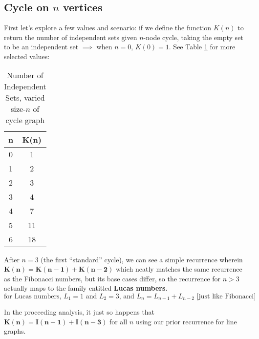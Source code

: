 \documentclass[conference]{styles/acmsiggraph}
\newcommand{\?}{\stackrel{?}{=}}
\DeclareRobustCommand{\mybox}[2][gray!20]{%
\begin{tcolorbox}[   %
        breakable,
        left=0pt,
        right=0pt,
        top=0pt,
        bottom=0pt,
        colback=#1,
        colframe=#1,
        width=\dimexpr\textwidth\relax, 
        enlarge left by=0mm,
        boxsep=5pt,
        arc=0pt,outer arc=0pt,
        ]
        #2
\end{tcolorbox}
}
\begin{document}
\newpage
\subsection{Cycle on $n$ vertices}
First let's explore a few values and scenario: if we define the function $K(n)$ to return the number of independent sets given $n$-node cycle, taking the empty set to be an independent set $\implies$ when $n=0$, $K(0) = 1$.  See Table \ref{tab:cycle} for more selected values:

\begin{table}[htbp]
  \centering
    \begin{tabular}{c|c}
    \multicolumn{1}{c}{n} & K(n) \\
    \midrule
    0     & 1 \\
    1     & 2 \\
    2     & 3 \\
    3     & 4 \\
    4     & 7 \\
    5     & 11 \\
    6     & 18 \\
    \end{tabular}%
    \caption{Number of Independent Sets, varied size-$n$ of cycle graph}
    \label{tab:cycle}
\end{table}%
\FloatBarrier

\mybox{
After $n = 3$ (the first \enquote{standard} cycle), we can see a simple recurrence wherein $\mathbf{K(n) = K(n-1) + K(n-2)}$ which neatly matches the same recurrence as the Fibonacci numbers, but its base cases differ, so the recurrence for $n > 3$ actually maps to the family entitled \textbf{Lucas numbers}.
$$\text{for Lucas numbers, }L_1 = 1\text{ and }L_2 = 3\text{, and }L_n = L_{n-1} + L_{n-2}\text{ [just like Fibonacci]}$$

In the proceeding analysis, it just so happens that $\mathbf{K(n) = I(n-1) + I(n-3)}$ for all $n$ using our prior recurrence for line graphs.
}
\end{document}
